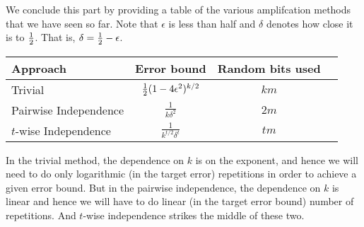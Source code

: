 We conclude this part by providing a table of the various amplifcation methods that we have seen so far. Note that $\epsilon$ is less than half and $\delta$ denotes how close it is to $\frac{1}{2}$. That is, $\delta = \frac{1}{2} - \epsilon$.

\renewcommand{\arraystretch}{2}
\begin{center}
\begin{tabular}{|l|c|c|c|}
\hline 
Approach & Error bound & Random bits used  \\ 
\hline 
Trivial & $\frac{1}{2}(1-4\epsilon^2)^{k/2}$ & $km$ \\ 
\hline 
Pairwise Independence & $\frac{\displaystyle 1}{\displaystyle k\delta^2}$ & $2m$ \\[2mm]
\hline
$t$-wise Independence & $\frac{1}{\displaystyle k^{t/2}\delta^t}$ & $tm$ \\[2mm] 
\hline
\end{tabular} 
\end{center}
In the trivial method, the dependence on $k$ is on the exponent, and hence we will need to do only logarithmic (in the target error) repetitions in order to achieve a given error bound. But in the pairwise independence, the dependence on $k$ is linear and hence we will have to do linear (in the target error bound) number of repetitions. And $t$-wise independence strikes the middle of these two.
\renewcommand{\arraystretch}{1}
